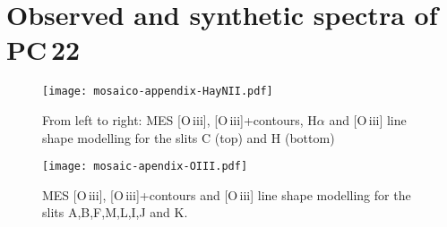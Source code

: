 \documentclass[fleqn,usenatbib,useAMS]{mnras}
\begin{document}




\bsp



\appendix
\section{Observed and synthetic spectra of PC\,22}

\begin{figure*}
\begin{center}
\vspace{3cm}
\texttt{[image: mosaico-appendix-HayNII.pdf]}
\caption{From left to right: MES [O\,{\sc iii}], [O\,{\sc iii}]+contours, H$\alpha$  and [O\,{\sc iii}] line {\sc shape} modelling for the slits C (top) and H (bottom)}
\label{app1}
\end{center}
\end{figure*}

\begin{figure*}
\begin{center}
\vspace{2cm}
\texttt{[image: mosaic-apendix-OIII.pdf]}
\caption{MES [O\,{\sc iii}], [O\,{\sc iii}]+contours and [O\,{\sc iii}] line {\sc shape} modelling for the slits A,B,F,M,L,I,J and K.}
\label{app2}
\end{center}
\end{figure*}





\end{document}
